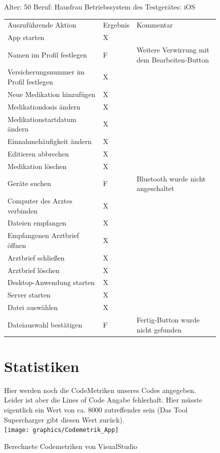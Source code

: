 \documentclass[a4paper]{scrreprt}
\begin{document}
 \begin{figure}
 
   Alter: 50 \newline
Beruf: Hausfrau \newline
Betriebssystem des Testgerätes: iOS \newline \newline
 \begin{tabular}{ |l|l| p{6cm} }
  Auszuführende Aktion & Ergebnis & Kommentar \\
App starten & X & \\
Namen im Profil festlegen & F & Weitere Verwirrung mit dem Bearbeiten-Button \\
Versicherungsnummer im Profil festlegen & X & \\
Neue Medikation hinzufügen & X & \\
Medikationdosis ändern & X & \\
Medikationstartdatum ändern & X & \\
Einnahmehäufigkeit ändern & X & \\
Editieren abbrechen & X & \\
Medikation löschen & X & \\
Geräte suchen & F & Bluetooth wurde nicht angeschaltet \\
Computer des Arztes verbinden & X & \\
Dateien empfangen & X & \\
Empfangenen Arztbrief öffnen & X & \\
Arztbrief schließen & X & \\
Arztbrief löschen & X & \\
Desktop-Anwendung starten & X & \\
Server starten & X & \\
Datei auswählen & X & \\
Dateiauswahl bestätigen & F & Fertig-Button wurde nicht gefunden \\
 \end{tabular}
\end{figure}
\begin{figure}

\section{Statistiken}
Hier werden noch die CodeMetriken unseres Codes angegeben. Leider ist aber die Lines of Code Angabe fehlerhaft. Hier müsste eigentlich ein Wert von ca. 8000 zutreffender sein (Das Tool Supercharger gibt diesen Wert zurück). \\
\texttt{[image: graphics/Codemetrik\_App]}
\caption{Berechnete Codemetriken von VisualStudio}
\end{figure}

\printnoidxglossaries

\listoffigures
 
\end{document}
